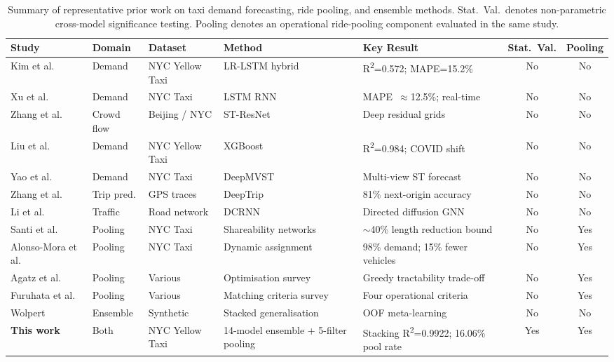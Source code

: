 \documentclass[a4paper,fleqn]{cas-dc}
\begin{document}
\begin{table}[t]
\centering
\caption{Summary of representative prior work on taxi demand forecasting, ride pooling, and ensemble methods. Stat.\ Val.\ denotes non-parametric cross-model significance testing. Pooling denotes an operational ride-pooling component evaluated in the same study.\label{tab:litreview}}
\small
\begin{tabular}{@{}p{2.3cm}p{1.55cm}p{2.1cm}p{2.55cm}p{2.7cm}cc@{}}
\toprule
\textbf{Study} & \textbf{Domain} & \textbf{Dataset} & \textbf{Method} & \textbf{Key Result} & \textbf{Stat.\ Val.} & \textbf{Pooling} \\
\midrule
Kim et al.~\cite{kim2020hybrid} & Demand & NYC Yellow Taxi & LR-LSTM hybrid & R\textsuperscript{2}=0.572; MAPE=15.2\% & No & No \\
Xu et al.~\cite{xu2017realtime} & Demand & NYC Taxi & LSTM RNN & MAPE~$\approx$12.5\%; real-time & No & No \\
Zhang et al.~\cite{zhang2017deep} & Crowd flow & Beijing / NYC & ST-ResNet & Deep residual grids & No & No \\
Liu et al.~\cite{liu2021epidemic} & Demand & NYC Yellow Taxi & XGBoost & R\textsuperscript{2}=0.984; COVID shift & No & No \\
Yao et al.~\cite{yao2018deeptraffic} & Demand & NYC Taxi & DeepMVST & Multi-view ST forecast & No & No \\
Zhang et al.~\cite{zhang2023deeptrip} & Trip pred. & GPS traces & DeepTrip & 81\% next-origin accuracy & No & No \\
Li et al.~\cite{li2018diffusion} & Traffic & Road network & DCRNN & Directed diffusion GNN & No & No \\
Santi et al.~\cite{santi2014quantifying} & Pooling & NYC Taxi & Shareability networks & $\sim$40\% length reduction bound & No & Yes \\
Alonso-Mora et al.~\cite{alonso2017demand} & Pooling & NYC Taxi & Dynamic assignment & 98\% demand; 15\% fewer vehicles & No & Yes \\
Agatz et al.~\cite{agatz2012ridesharing} & Pooling & Various & Optimisation survey & Greedy tractability trade-off & No & Yes \\
Furuhata et al.~\cite{furuhata2013ridesharing} & Pooling & Various & Matching criteria survey & Four operational criteria & No & Yes \\
Wolpert~\cite{wolpert1992stacking} & Ensemble & Synthetic & Stacked generalisation & OOF meta-learning & No & No \\
\textbf{This work} & Both & NYC Yellow Taxi & 14-model ensemble + 5-filter pooling & Stacking R\textsuperscript{2}=0.9922; 16.06\% pool rate & Yes & Yes \\
\bottomrule
\end{tabular}
\end{table}
\end{document}
